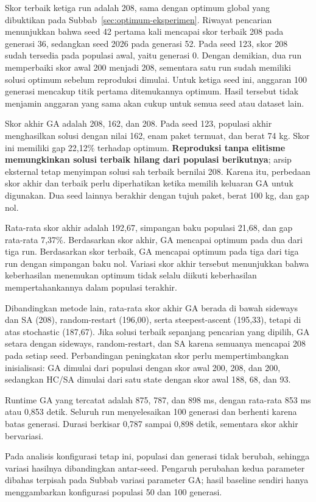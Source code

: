 \documentclass[12pt,a4paper]{article}
\begin{document}
Skor terbaik ketiga run adalah 208, sama dengan optimum global yang dibuktikan pada Subbab~\ref{sec:optimum-eksperimen}. Riwayat pencarian menunjukkan bahwa seed 42 pertama kali mencapai skor terbaik 208 pada generasi 36, sedangkan seed 2026 pada generasi 52. Pada seed 123, skor 208 sudah tersedia pada populasi awal, yaitu generasi 0. Dengan demikian, dua run memperbaiki skor awal 200 menjadi 208, sementara satu run sudah memiliki solusi optimum sebelum reproduksi dimulai. Untuk ketiga seed ini, anggaran 100 generasi mencakup titik pertama ditemukannya optimum. Hasil tersebut tidak menjamin anggaran yang sama akan cukup untuk semua seed atau dataset lain.

Skor akhir GA adalah 208, 162, dan 208. Pada seed 123, populasi akhir menghasilkan solusi dengan nilai 162, enam paket termuat, dan berat 74 kg. Skor ini memiliki gap 22,12\% terhadap optimum. \textbf{Reproduksi tanpa elitisme memungkinkan solusi terbaik hilang dari populasi berikutnya}; arsip eksternal tetap menyimpan solusi sah terbaik bernilai 208. Karena itu, perbedaan skor akhir dan terbaik perlu diperhatikan ketika memilih keluaran GA untuk digunakan. Dua seed lainnya berakhir dengan tujuh paket, berat 100 kg, dan gap nol.

Rata-rata skor akhir adalah 192,67, simpangan baku populasi 21,68, dan gap rata-rata 7,37\%. Berdasarkan skor akhir, GA mencapai optimum pada dua dari tiga run. Berdasarkan skor terbaik, GA mencapai optimum pada tiga dari tiga run dengan simpangan baku nol. Variasi skor akhir tersebut menunjukkan bahwa keberhasilan menemukan optimum tidak selalu diikuti keberhasilan mempertahankannya dalam populasi terakhir.

Dibandingkan metode lain, rata-rata skor akhir GA berada di bawah sideways dan SA (208), random-restart (196,00), serta steepest-ascent (195,33), tetapi di atas stochastic (187,67). Jika solusi terbaik sepanjang pencarian yang dipilih, GA setara dengan sideways, random-restart, dan SA karena semuanya mencapai 208 pada setiap seed. Perbandingan peningkatan skor perlu mempertimbangkan inisialisasi: GA dimulai dari populasi dengan skor awal 200, 208, dan 200, sedangkan HC/SA dimulai dari satu state dengan skor awal 188, 68, dan 93.

Runtime GA yang tercatat adalah 875, 787, dan 898 ms, dengan rata-rata 853 ms atau 0,853 detik. Seluruh run menyelesaikan 100 generasi dan berhenti karena batas generasi. Durasi berkisar 0,787 sampai 0,898 detik, sementara skor akhir bervariasi.

Pada analisis konfigurasi tetap ini, populasi dan generasi tidak berubah, sehingga variasi hasilnya dibandingkan antar-seed. Pengaruh perubahan kedua parameter dibahas terpisah pada Subbab variasi parameter GA; hasil baseline sendiri hanya menggambarkan konfigurasi populasi 50 dan 100 generasi.
\end{document}
